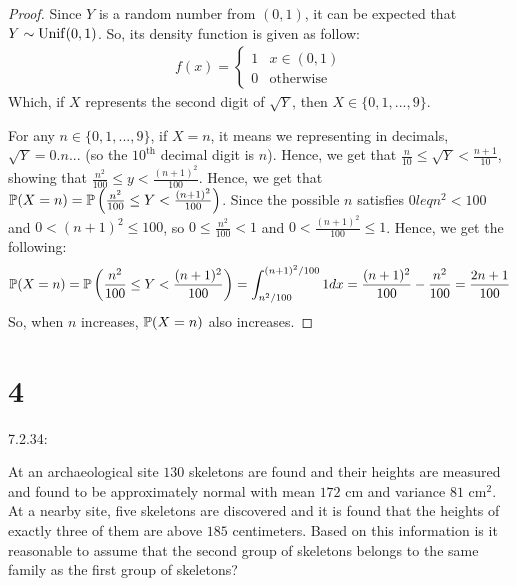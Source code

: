 \documentclass{article}
\begin{document}
\begin{proof}
    Since $Y$ is a random number from $(0,1)$, it can be expected that $Y \sim \mathrm{Unif}(0,1)$. So, its density function is given as follow:
    \begin{align}
        f(x)=\begin{cases}
            1 & x\in (0,1)\\
            0 & \text{otherwise}
        \end{cases}
    \end{align}
    Which, if $X$ represents the second digit of $\sqrt{Y}$, then $X \in \{0,1,...,9\}$.

    For any $n \in \{0,1,...,9\}$, if $X=n$, it means we representing in decimals, $\sqrt{Y} = 0.n...$ (so the $10^\text{th}$ decimal digit is $n$). Hence, we get that $\frac{n}{10}\leq \sqrt{Y}<\frac{n+1}{10}$, showing that $\frac{n^2}{100}\leq y<\frac{(n+1)^2}{100}$. Hence, we get that $\mathbb{P}(X=n) = \mathbb{P}\left(\frac{n^2}{100}\leq Y<\frac{(n+1)^2}{100}\right)$. Since the possible $n$ satisfies $0leq n^2< 100$ and $0<(n+1)^2\leq 100$, so $0\leq \frac{n^2}{100}<1$ and $0<\frac{(n+1)^2}{100}\leq 1$. Hence, we get the following:
    \begin{align}
        \mathbb{P}(X=n)=\mathbb{P}\left(\frac{n^2}{100}\leq Y<\frac{(n+1)^2}{100}\right) = \int_{n^2/100}^{(n+1)^2/100}1 dx = \frac{(n+1)^2}{100}-\frac{n^2}{100} = \frac{2n+1}{100}
    \end{align}
    So, when $n$ increases, $\mathbb{P}(X=n)$ also increases.
\end{proof}

\hfil

\section*{4}
\begin{ques}\label{q4}
    7.2.34:

    At an archaeological site $130$ skeletons are found and their heights are measured and found to be approximately normal with mean $172$ cm and variance $81$ cm$ ^2$. At a nearby site, five skeletons are discovered and it is found that the heights of exactly three of them are above $185$ centimeters. Based on this information is it reasonable to assume that the second group of skeletons belongs to the same family as the first group of skeletons?
\end{ques}
\end{document}

